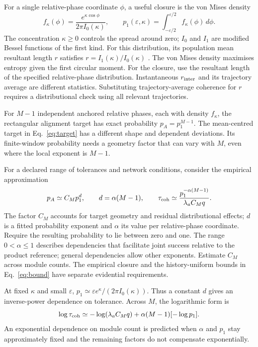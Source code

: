 \documentclass[11pt]{article}
\begin{document}
For a single relative-phase coordinate $\phi$, a useful closure is the
von Mises density
\begin{equation}
 f_\kappa(\phi)=\frac{e^{\kappa\cos\phi}}{2\pi I_0(\kappa)},\qquad
 p_1(\varepsilon,\kappa)=
 \int_{-\varepsilon/2}^{\varepsilon/2}f_\kappa(\phi)\,d\phi.
 \label{eq:mises}
\end{equation}
The concentration $\kappa\geq0$ controls the spread around zero;
$I_0$ and $I_1$ are modified Bessel functions of the first kind.
For this distribution, its population mean resultant length $r$
satisfies $r=I_1(\kappa)/I_0(\kappa)$ \cite{mardia2000}. The von
Mises density maximises entropy given the first circular moment.
For the closure, use the resultant length of the specified relative-phase
distribution. Instantaneous $r_{\rm inter}$ and its trajectory average are
different statistics. Substituting trajectory-average coherence for $r$
requires a distributional check using all relevant trajectories.

For $M-1$ independent anchored relative phases, each with density
$f_\kappa$, the rectangular alignment target has exact probability
$p_A=p_1^{M-1}$. The mean-centred target in
Eq.~\ref{eq:target} has a different shape and dependent deviations.
Its finite-window probability needs a geometry factor that can vary
with $M$, even where the local exponent is $M-1$.

For a declared range of tolerances and network conditions, consider
the empirical approximation
\begin{equation}
 p_A\simeq C_M p_1^{d},\qquad
 d=\alpha(M-1),\qquad
 \tau_{\rm coh}\simeq
 \frac{p_1^{-\alpha(M-1)}}{\lambda_a C_M q}.
 \label{eq:closure}
\end{equation}
The factor $C_M$ accounts for target geometry and residual distributional
effects; $d$ is a fitted probability exponent and $\alpha$ its value
per relative-phase coordinate. Require the resulting probability to lie
between zero and one. The range $0<\alpha\leq1$ describes dependencies
that facilitate joint success relative to the product reference; general
dependencies allow other exponents. Estimate $C_M$ across module counts.
The empirical closure and the history-uniform bounds in
Eq.~\ref{eq:bound} have separate evidential requirements.

At fixed $\kappa$ and small $\varepsilon$,
$p_1\simeq\varepsilon e^\kappa/(2\pi I_0(\kappa))$. Thus a constant
$d$ gives an inverse-power dependence on tolerance. Across $M$, the
logarithmic form is
\begin{equation}
 \log\tau_{\rm coh}\simeq
 -\log(\lambda_a C_Mq)
 +\alpha(M-1)[-\log p_1].
 \label{eq:log}
\end{equation}
An exponential dependence on module count is predicted when
$\alpha$ and $p_1$ stay approximately fixed and the remaining factors
do not compensate exponentially.
\end{document}
